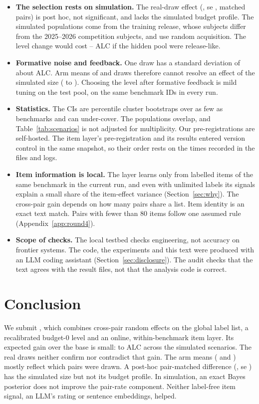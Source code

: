 \documentclass{article}
\begin{document}
\begin{itemize}
\item \textbf{The selection rests on simulation.} The real-draw effect (\PmMean, se \PmSe, \PmN{} matched pairs) is post hoc, not significant, and lacks the simulated budget profile. The simulated populations come from the training release, whose subjects differ from the 2025--2026 competition subjects, and use random acquisition. The level change would cost \DdSelCostMin--\DdSelCostMax{} ALC if the hidden pool were release-like.
\item \textbf{Formative noise and feedback.} One draw has a standard deviation of about \ArBaseSd{} ALC. Arm means of \ArBaseN{} and \ArWtwoN{} draws therefore cannot resolve an effect of the simulated size (\WcSmallest{} to \WcLargest). Choosing the level after formative feedback is mild tuning on the test pool, on the same \ArBenchAll{} benchmark IDs in every run.
\item \textbf{Statistics.} The CIs are percentile cluster bootstraps over as few as \WcInvNBench{} benchmarks and can under-cover. The populations overlap, and Table~\ref{tab:scenarios} is not adjusted for multiplicity. Our pre-registrations are self-hosted. The item layer's pre-registration and its results entered version control in the same snapshot, so their order rests on the times recorded in the files and logs.
\item \textbf{Item information is local.} The layer learns only from labelled items of the same benchmark in the current run, and even with unlimited labels its signals explain a small share of the item-effect variance (Section~\ref{sec:why}). The cross-pair gain depends on how many pairs share a list. Item identity is an exact text match. Pairs with fewer than 80 items follow one assumed rule (Appendix~\ref{app:round4}).
\item \textbf{Scope of checks.} The local testbed checks engineering, not accuracy on frontier systems. The code, the experiments and this text were produced with an LLM coding assistant (Section~\ref{sec:disclosure}). The audit checks that the text agrees with the result files, not that the analysis code is correct.
\end{itemize}

\section{Conclusion}
\label{sec:conclusion}

We submit \SubId, which combines cross-pair random effects on the global label list, a recalibrated budget-0 level and an online, within-benchmark item layer. Its expected gain over the base is small: \WcSmallest{} to \WcLargest{} ALC across the simulated scenarios. The real draws neither confirm nor contradict that gain. The arm means (\ArBaseMean{} and \ArWtwoMean) mostly reflect which pairs were drawn. A post-hoc pair-matched difference (\PmMean, se \PmSe) has the simulated size but not its budget profile. In simulation, an exact Bayes posterior does not improve the pair-rate component. Neither label-free item signal, an LLM's rating or sentence embeddings, helped.
\end{document}
